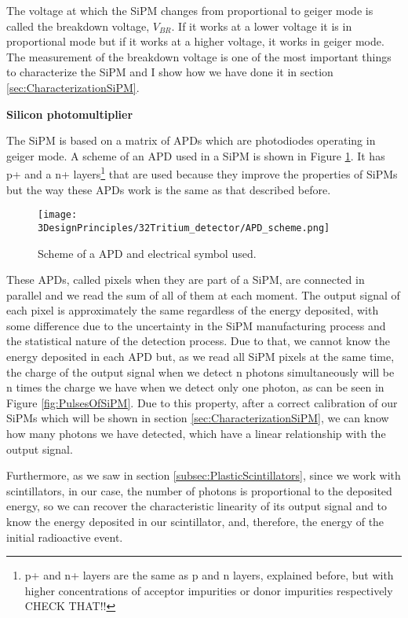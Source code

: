 The voltage at which the SiPM changes from proportional to geiger mode is called the breakdown voltage, $ V_ {BR} $. If it works at a lower voltage it is in proportional mode but if it works at a higher voltage, it works in geiger mode. The measurement of the breakdown voltage is one of the most important things to characterize the SiPM and I show how we have done it in section \ref{sec:CharacterizationSiPM}.

\textbf{Silicon photomultiplier}

The SiPM is based on a matrix of APDs which are photodiodes operating in geiger mode. A scheme of an APD used in a SiPM is shown in Figure \ref{fig:SchemeAPD}. It has p+ and a n+ layers\footnote{p+ and n+ layers are the same as p and n layers, explained before, but with higher concentrations of acceptor impurities or donor impurities respectively CHECK THAT!!} that are used because they improve the properties of SiPMs but the way these APDs work is the same as that described before. 

\begin{figure}[htbp]
\centering
\texttt{[image: 3DesignPrinciples/32Tritium\_detector/APD\_scheme.png]}
\caption{Scheme of a APD and electrical symbol used.\label{fig:SchemeAPD}~\cite{OSI}}
\end{figure}
 
These APDs, called pixels when they are part of a SiPM, are connected in parallel and we read the sum of all of them at each moment. The output signal of each pixel is approximately the same regardless of the energy deposited, with some difference due to the uncertainty in the SiPM manufacturing process and the statistical nature of the detection process. Due to that, we cannot know the energy deposited in each APD but, as we read all SiPM pixels at the same time, the charge of the output signal when we detect n photons simultaneously will be n times the charge we have when we detect only one photon, as can be seen in Figure \ref{fig:PulsesOfSiPM}. Due to this property, after a correct calibration of our SiPMs which will be shown in section \ref{sec:CharacterizationSiPM}, we can know how many photons we have detected, which have a linear relationship with the output signal. 

Furthermore, as we saw in section \ref{subsec:PlasticScintillators}, since we work with scintillators, in our case, the number of photons is proportional to the deposited energy, so we can recover the characteristic linearity of its output signal and to know the energy deposited in our scintillator, and, therefore, the energy of the initial radioactive event.

